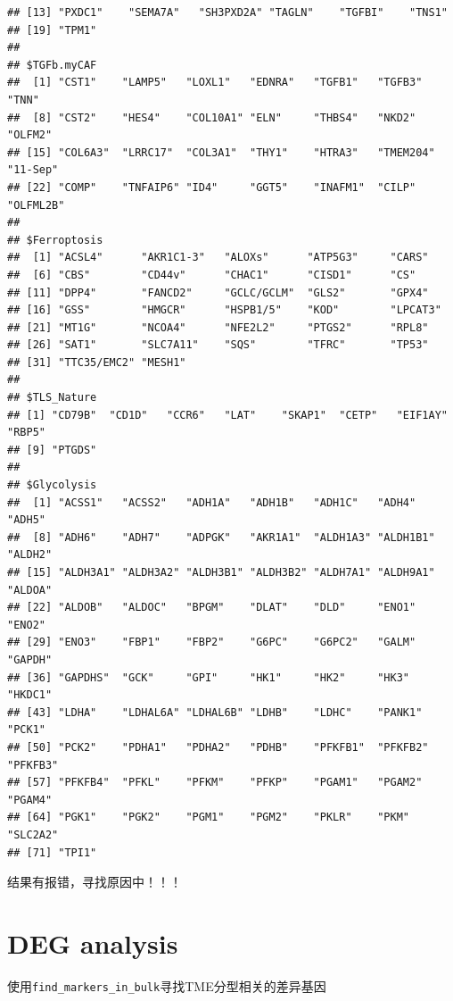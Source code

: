 \documentclass[
  12pt,
]{book}
\theoremstyle{definition}
\theoremstyle{definition}
\theoremstyle{definition}
\theoremstyle{definition}
\theoremstyle{remark}
\begin{document}
\begin{verbatim}
## [13] "PXDC1"    "SEMA7A"   "SH3PXD2A" "TAGLN"    "TGFBI"    "TNS1"    
## [19] "TPM1"    
## 
## $TGFb.myCAF
##  [1] "CST1"    "LAMP5"   "LOXL1"   "EDNRA"   "TGFB1"   "TGFB3"   "TNN"    
##  [8] "CST2"    "HES4"    "COL10A1" "ELN"     "THBS4"   "NKD2"    "OLFM2"  
## [15] "COL6A3"  "LRRC17"  "COL3A1"  "THY1"    "HTRA3"   "TMEM204" "11-Sep" 
## [22] "COMP"    "TNFAIP6" "ID4"     "GGT5"    "INAFM1"  "CILP"    "OLFML2B"
## 
## $Ferroptosis
##  [1] "ACSL4"      "AKR1C1-3"   "ALOXs"      "ATP5G3"     "CARS"      
##  [6] "CBS"        "CD44v"      "CHAC1"      "CISD1"      "CS"        
## [11] "DPP4"       "FANCD2"     "GCLC/GCLM"  "GLS2"       "GPX4"      
## [16] "GSS"        "HMGCR"      "HSPB1/5"    "KOD"        "LPCAT3"    
## [21] "MT1G"       "NCOA4"      "NFE2L2"     "PTGS2"      "RPL8"      
## [26] "SAT1"       "SLC7A11"    "SQS"        "TFRC"       "TP53"      
## [31] "TTC35/EMC2" "MESH1"     
## 
## $TLS_Nature
## [1] "CD79B"  "CD1D"   "CCR6"   "LAT"    "SKAP1"  "CETP"   "EIF1AY" "RBP5"  
## [9] "PTGDS" 
## 
## $Glycolysis
##  [1] "ACSS1"   "ACSS2"   "ADH1A"   "ADH1B"   "ADH1C"   "ADH4"    "ADH5"   
##  [8] "ADH6"    "ADH7"    "ADPGK"   "AKR1A1"  "ALDH1A3" "ALDH1B1" "ALDH2"  
## [15] "ALDH3A1" "ALDH3A2" "ALDH3B1" "ALDH3B2" "ALDH7A1" "ALDH9A1" "ALDOA"  
## [22] "ALDOB"   "ALDOC"   "BPGM"    "DLAT"    "DLD"     "ENO1"    "ENO2"   
## [29] "ENO3"    "FBP1"    "FBP2"    "G6PC"    "G6PC2"   "GALM"    "GAPDH"  
## [36] "GAPDHS"  "GCK"     "GPI"     "HK1"     "HK2"     "HK3"     "HKDC1"  
## [43] "LDHA"    "LDHAL6A" "LDHAL6B" "LDHB"    "LDHC"    "PANK1"   "PCK1"   
## [50] "PCK2"    "PDHA1"   "PDHA2"   "PDHB"    "PFKFB1"  "PFKFB2"  "PFKFB3" 
## [57] "PFKFB4"  "PFKL"    "PFKM"    "PFKP"    "PGAM1"   "PGAM2"   "PGAM4"  
## [64] "PGK1"    "PGK2"    "PGM1"    "PGM2"    "PKLR"    "PKM"     "SLC2A2" 
## [71] "TPI1"
\end{verbatim}

结果有报错，寻找原因中！！！

\hypertarget{deg-analysis-1}{%
\section{DEG analysis}\label{deg-analysis-1}}

使用\texttt{find\_markers\_in\_bulk}寻找TME分型相关的差异基因
\end{document}
